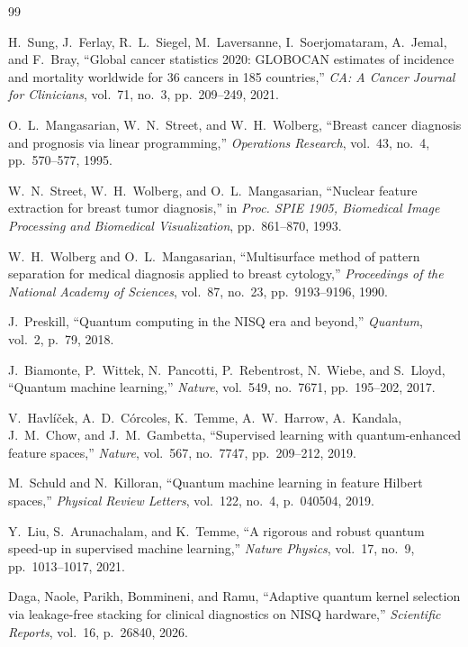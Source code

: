 \documentclass[journal,twocolumn]{IEEEtran}
\begin{document}
\begin{thebibliography}{99}

H.~Sung, J.~Ferlay, R.~L.~Siegel, M.~Laversanne, I.~Soerjomataram, A.~Jemal, and F.~Bray,
``Global cancer statistics 2020: GLOBOCAN estimates of incidence and mortality worldwide for 36 cancers in 185 countries,''
\emph{CA: A Cancer Journal for Clinicians}, vol.~71, no.~3, pp.~209--249, 2021.

O.~L.~Mangasarian, W.~N.~Street, and W.~H.~Wolberg,
``Breast cancer diagnosis and prognosis via linear programming,''
\emph{Operations Research}, vol.~43, no.~4, pp.~570--577, 1995.

W.~N.~Street, W.~H.~Wolberg, and O.~L.~Mangasarian,
``Nuclear feature extraction for breast tumor diagnosis,''
in \emph{Proc. SPIE 1905, Biomedical Image Processing and Biomedical Visualization}, pp.~861--870, 1993.

W.~H.~Wolberg and O.~L.~Mangasarian,
``Multisurface method of pattern separation for medical diagnosis applied to breast cytology,''
\emph{Proceedings of the National Academy of Sciences}, vol.~87, no.~23, pp.~9193--9196, 1990.

J.~Preskill,
``Quantum computing in the NISQ era and beyond,''
\emph{Quantum}, vol.~2, p.~79, 2018.

J.~Biamonte, P.~Wittek, N.~Pancotti, P.~Rebentrost, N.~Wiebe, and S.~Lloyd,
``Quantum machine learning,''
\emph{Nature}, vol.~549, no.~7671, pp.~195--202, 2017.

V.~Havl{\'i}{\v c}ek, A.~D.~C{\'o}rcoles, K.~Temme, A.~W.~Harrow, A.~Kandala, J.~M.~Chow, and J.~M.~Gambetta,
``Supervised learning with quantum-enhanced feature spaces,''
\emph{Nature}, vol.~567, no.~7747, pp.~209--212, 2019.

M.~Schuld and N.~Killoran,
``Quantum machine learning in feature Hilbert spaces,''
\emph{Physical Review Letters}, vol.~122, no.~4, p.~040504, 2019.

Y.~Liu, S.~Arunachalam, and K.~Temme,
``A rigorous and robust quantum speed-up in supervised machine learning,''
\emph{Nature Physics}, vol.~17, no.~9, pp.~1013--1017, 2021.

Daga, Naole, Parikh, Bommineni, and Ramu,
``Adaptive quantum kernel selection via leakage-free stacking for clinical diagnostics on NISQ hardware,''
\emph{Scientific Reports}, vol.~16, p.~26840, 2026.


\end{thebibliography}
\end{document}
